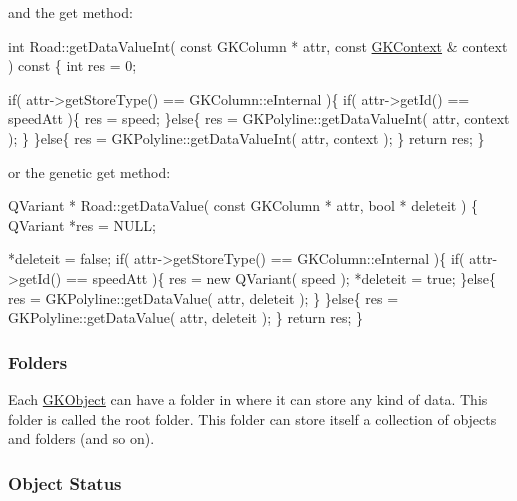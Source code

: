 and the get method\+: 
\begin{DoxyCode}
\textcolor{keywordtype}{int} Road::getDataValueInt( \textcolor{keyword}{const} GKColumn * attr, \textcolor{keyword}{const} \hyperlink{classGKContext}{GKContext} & context )\textcolor{keyword}{ const}
\textcolor{keyword}{}\{
    \textcolor{keywordtype}{int}     res = 0;

    \textcolor{keywordflow}{if}( attr->getStoreType() == GKColumn::eInternal )\{
        \textcolor{keywordflow}{if}( attr->getId() == speedAtt )\{
            res = speed;
        \}\textcolor{keywordflow}{else}\{
            res = GKPolyline::getDataValueInt( attr, context );
        \}
    \}\textcolor{keywordflow}{else}\{
        res = GKPolyline::getDataValueInt( attr, context );
    \}
    \textcolor{keywordflow}{return} res;
\}   
\end{DoxyCode}


or the genetic get method\+: 
\begin{DoxyCode}
QVariant * Road::getDataValue( \textcolor{keyword}{const} GKColumn * attr, \textcolor{keywordtype}{bool} * deleteit )
\{
    QVariant        *res = NULL;

     *deleteit = \textcolor{keyword}{false};
    \textcolor{keywordflow}{if}( attr->getStoreType() == GKColumn::eInternal )\{
        \textcolor{keywordflow}{if}( attr->getId() == speedAtt )\{
            res = \textcolor{keyword}{new} QVariant( speed );    
             *deleteit = \textcolor{keyword}{true};
        \}\textcolor{keywordflow}{else}\{
            res = GKPolyline::getDataValue( attr, deleteit );
        \}
    \}\textcolor{keywordflow}{else}\{
        res = GKPolyline::getDataValue( attr, deleteit );
    \}
    \textcolor{keywordflow}{return} res;
\}   
\end{DoxyCode}


\subsubsection*{Folders}

Each \hyperlink{classGKObject}{G\+K\+Object} can have a folder in where it can store any kind of data. This folder is called the root folder. This folder can store itself a collection of objects and folders (and so on).

\subsubsection*{Object Status}

